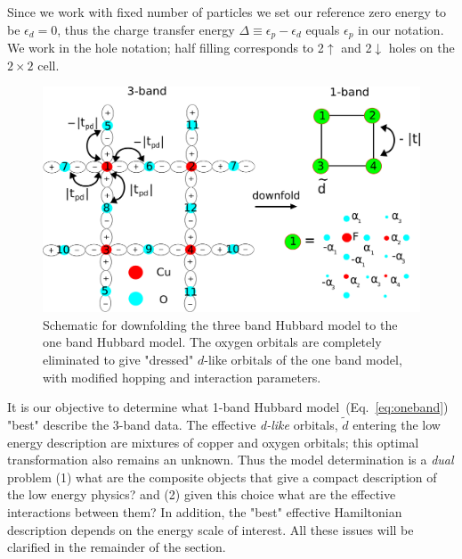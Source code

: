 Since we work with fixed number of particles we set our reference zero energy 
to be $\epsilon_d = 0$, thus the charge transfer energy $\Delta \equiv \epsilon_p - \epsilon_d$ equals $\epsilon_p$ in our notation. 
We work in the hole notation; half filling corresponds to 2$\uparrow$ and 2$\downarrow$ holes on the $2\times2$ cell.
\begin{figure}[htpb]
\centering
\includegraphics[width=0.8\linewidth]{./Figures/three_band_figure.eps}
\caption{Schematic for downfolding the three band Hubbard model to the one band Hubbard model. 
The oxygen orbitals are completely eliminated to give "dressed" $d$-like orbitals of the one band model, with modified hopping 
and interaction parameters.}
\label{fig:threeband} 
\end{figure}	

It is our objective to determine what 1-band Hubbard model~(Eq.~\ref{eq:oneband}) 
"best" describe the 3-band data. The effective \textit{d-like} orbitals, $\tilde{d}$ entering the low energy description 
are mixtures of copper and oxygen orbitals; this optimal transformation also remains an unknown. 
Thus the model determination is a \emph{dual} problem (1) 
what are the composite objects that give a compact description of the low energy physics? and (2) 
given this choice what are the effective interactions between them? 
In addition, the "best" effective Hamiltonian description depends on the energy scale of interest. 
All these issues will be clarified in the remainder of the section. 

